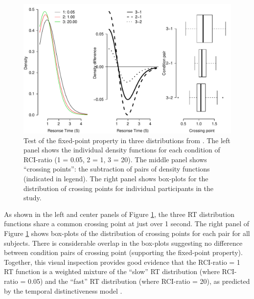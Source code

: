\documentclass[a4paper, jou, natbib]{apa6}
\begin{document}
\begin{figure}
\begin{center}
\includegraphics[width = \textwidth]{Images/mixtureDistributionData.pdf}
\caption{Test of the fixed-point property in three distributions from \cite{Grangeinrevision}. The left panel shows the individual density functions for each condition of RCI-ratio (1 = 0.05, 2 = 1, 3 = 20). The middle panel shows ``crossing points'': the subtraction of pairs of density functions (indicated in legend). The right panel shows box-plots for the distribution of crossing points for individual participants in the study.}
\label{fig:mixtureDistributionData}
\end{center}
\end{figure}

As shown in the left and center panels of Figure \ref{fig:mixtureDistributionData}, the three RT distribution functions share a common crossing point at just over 1 second. The right panel of Figure \ref{fig:mixtureDistributionData} shows box-plots of the distribution of crossing points for each pair for all subjects. There is considerable overlap in the box-plots suggesting no difference between condition pairs of crossing point (supporting the fixed-point property). Together, this visual inspection provides good evidence that the RCI-ratio = 1 RT function is a weighted mixture of the ``slow'' RT distribution (where RCI-ratio = 0.05) and the ``fast'' RT distribution (where RCI-ratio = 20), as predicted by the temporal distinctiveness model \cite{Grange2015}.
\end{document}
